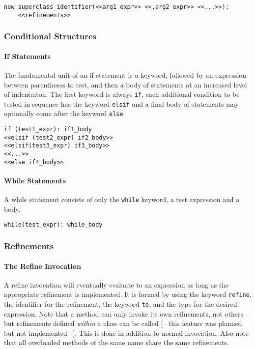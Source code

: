 \begin{lstlisting}
new superclass_identifier(<<arg1_expr>> <<,arg2_expr>> <<...>>):
    <<refinements>>
\end{lstlisting}

\subsubsection{Conditional Structures}
\paragraph{If Statements}
The fundamental unit of an if statement is a keyword, followed by an expression between parentheses to test, and then a body of statements at an increased level of indentaiton. The first keyword is always \verb!if!, each additional condition to be tested in sequence has the keyword \verb!elsif! and a final body of statements may optionally come after the keyword \verb!else!.

\begin{lstlisting}
if (test1_expr): if1_body
<<elsif (test2_expr) if2_body>>
<<elsif(test3_expr) if3_body>>
<<...>>
<<else if4_body>>
\end{lstlisting}

\paragraph{While Statements}
A while statement consists of only the \verb!while! keyword, a test expression and a body.

\begin{lstlisting}
while(test_expr): while_body
\end{lstlisting}

\subsubsection{Refinements}
\paragraph{The Refine Invocation}
A refine invocation will eventually evaluate to an expression as long as the appropriate refinement is implemented. It is formed by using the keyword \verb!refine!, the identifier for the refinement, the keyword \verb!to!, and the type for the desired expression. Note that a method can only invoke its own refinements, not others -- but refinements defined \emph{within} a class can be called [-- this feature was planned but not implemented --]. This is done in addition to normal invocation. Also note that all overloaded methods of the same name share the same refinements.


